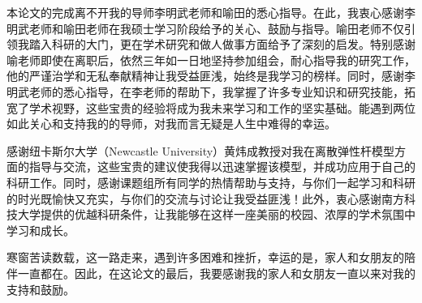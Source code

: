 
\begin{acknowledgements}

本论文的完成离不开我的导师李明武老师和喻田的悉心指导。在此，我衷心感谢李明武老师和喻田老师在我硕士学习阶段给予的关心、鼓励与指导。喻田老师不仅引领我踏入科研的大门，更在学术研究和做人做事方面给予了深刻的启发。特别感谢喻老师即使在离职后，依然三年如一日地坚持参加组会，耐心指导我的研究工作，他的严谨治学和无私奉献精神让我受益匪浅，始终是我学习的榜样。同时，感谢李明武老师的悉心指导，在李老师的帮助下，我掌握了许多专业知识和研究技能，拓宽了学术视野，这些宝贵的经验将成为我未来学习和工作的坚实基础。能遇到两位如此关心和支持我的的导师，对我而言无疑是人生中难得的幸运。

感谢纽卡斯尔大学（Newcastle University）黄炜成教授对我在离散弹性杆模型方面的指导与交流，这些宝贵的建议使我得以迅速掌握该模型，并成功应用于自己的科研工作。同时，感谢课题组所有同学的热情帮助与支持，与你们一起学习和科研的时光既愉快又充实，与你们的交流与讨论让我受益匪浅！此外，衷心感谢南方科技大学提供的优越科研条件，让我能够在这样一座美丽的校园、浓厚的学术氛围中学习和成长。

寒窗苦读数载，这一路走来，遇到许多困难和挫折，幸运的是，家人和女朋友的陪伴一直都在。因此，在这论文的最后，我要感谢我的家人和女朋友一直以来对我的支持和鼓励。


\end{acknowledgements}
